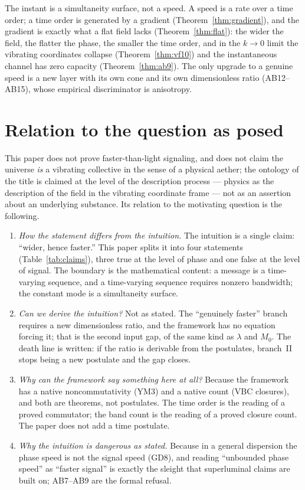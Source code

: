 \documentclass[aps,prd,preprint,superscriptaddress,amsmath,amssymb]{revtex4-2}
\begin{document}
The instant is a simultaneity surface, not a speed.  A speed is a
rate over a time order; a time order is generated by a gradient
(Theorem~\ref{thm:gradient}), and the gradient is exactly what a flat
field lacks (Theorem~\ref{thm:flat}): the wider the field, the
flatter the phase, the smaller the time order, and in the $k\to0$
limit the vibrating coordinates collapse
(Theorem~\ref{thm:vf10}) and the instantaneous channel has zero
capacity (Theorem~\ref{thm:ab9}).  The only upgrade to a genuine
speed is a new layer with its own cone and its own dimensionless ratio
(AB12--AB15), whose empirical discriminator is anisotropy.

\section{Relation to the question as posed}
\label{sec:relation}

This paper does not prove faster-than-light signaling, and does not
claim the universe \emph{is} a vibrating collective in the sense of a
physical aether; the ontology of the title is claimed at the level of
the description process --- physics as the description of the field in
the vibrating coordinate frame --- not as an assertion about an
underlying substance.  Its relation to the motivating question is the
following.

\begin{enumerate}
\item \emph{How the statement differs from the intuition.}
The intuition is a single claim: ``wider, hence faster.''  This paper
splits it into four statements (Table~\ref{tab:claims}), three true at
the level of phase and one false at the level of signal.  The
boundary is the mathematical content: a message is a time-varying
sequence, and a time-varying sequence requires nonzero bandwidth; the
constant mode is a simultaneity surface.
\item \emph{Can we derive the intuition?}
Not as stated.  The ``genuinely faster'' branch requires a new
dimensionless ratio, and the framework has no equation forcing it;
that is the second input gap, of the same kind as $\lambda$ and
$M_0$.  The death line is written: if the ratio is derivable from the
postulates, branch~II stops being a new postulate and the gap closes.
\item \emph{Why can the framework say something here at all?}
Because the framework has a native noncommutativity (YM3) and a
native count (VBC closures), and both are theorems, not postulates.
The time order is the reading of a proved commutator; the band count
is the reading of a proved closure count.  The paper does not add a
time postulate.
\item \emph{Why the intuition is dangerous as stated.}
Because in a general dispersion the phase speed is not the signal
speed (GD8), and reading ``unbounded phase speed'' as ``faster
signal'' is exactly the sleight that superluminal claims are built on;
AB7--AB9 are the formal refusal.
\end{enumerate}
\end{document}

